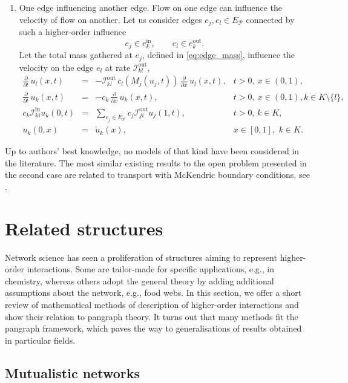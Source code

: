 \documentclass[a4paper,12pt]{article}
\theoremstyle{definition}
\theoremstyle{remark}
\newcommand{\mP}{\mathcal{P}}
\newcommand{\tin}{\mathrm{in}}
\newcommand{\out}{\mathrm{out}}
\newcommand{\inci}{\mathcal{I}^{\tin}}
\newcommand{\inco}{\mathcal{I}^{\out}}
\begin{document}
\begin{enumerate}
\item One edge influencing another edge. Flow on one edge can influence the velocity of flow on another. Let us consider edges $e_j,e_l\in E_{\mP}$ connected by such a higher-order influence 
\begin{equation*}
e_j\in e_k^{\textrm{in}} , \qquad e_l \in e_k^{\textrm{out}}.
\end{equation*}
Let the total mass gathered at $e_j$, defined in \eqref{eq:edge_mass}, influence the velocity on the edge $e_l$ at rate $\inco_{kl}$, 
\begin{equation*}
\begin{array}{rcll}
\frac{\partial}{\partial t}\, u_l(x,t) &=& - \inco_{kl}\, c_l\left(M_j(u_j,t)\right)\,\frac{\partial}{\partial x}\, u_l(x,t)
,&t >0,\ x\in(0,1),\\[.1cm]
\frac{\partial}{\partial t}\, u_k(x,t) &=& -c_k\,\frac{\partial}{\partial x}\, u_k(x,t)
,&t >0,\ x\in(0,1), k\in K\setminus\{l\},\\[.1cm]
c_k\inci_{ki} u_{k}(0,t)&=&\sum_{e_j\in E_{\mP}}c_j\inco_{ji}u_{j}(1,t),& t >0,\,k\in K,
\\[.1cm]
u_k(0,x)&=& \mathring{u}_k(x), &x\in\left[0,1\right],\,\,k\in K.
\end{array}
\end{equation*}
\end{enumerate}
Up to authors' best knowledge, no models of that kind have been considered in the literature. The most similar existing results to the open problem presented in the second case are related to transport with McKendric boundary conditions, see \cite{BGS2011}.


\section{Related structures}
\label{sec:other_structures}
Network science has seen a proliferation of structures aiming to represent higher-order interactions. Some are tailor-made for specific applications, e.g., in chemistry, whereas others adopt the general theory by adding additional assumptions about the network, e.g., food webs. In this section, we offer a short review of mathematical methods of description of higher-order interactions and show their relation to pangraph theory. It turns out that many methods fit the pangraph framework, which paves the way to generalisations of results obtained in particular fields.

\subsection{Mutualistic networks}\label{subsec:mutualistic_nets}
\end{document}
